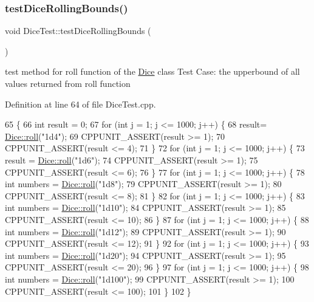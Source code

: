 \subsubsection{\texorpdfstring{test\+Dice\+Rolling\+Bounds()}{testDiceRollingBounds()}}
{\footnotesize\ttfamily void Dice\+Test\+::test\+Dice\+Rolling\+Bounds (\begin{DoxyParamCaption}{ }\end{DoxyParamCaption})\hspace{0.3cm}{\ttfamily [protected]}}

test method for roll function of the \hyperlink{class_dice}{Dice} class Test Case\+: the upperbound of all values returned from roll function 

Definition at line 64 of file Dice\+Test.\+cpp.


\begin{DoxyCode}
65 \{
66     \textcolor{keywordtype}{int} result = 0;
67     \textcolor{keywordflow}{for} (\textcolor{keywordtype}{int} j = 1; j <= 1000; j++) \{
68         result= \hyperlink{class_dice_a4923bdf22040579e6e071e1e987916c2}{Dice::roll}(\textcolor{stringliteral}{"1d4"});
69         CPPUNIT\_ASSERT(result >= 1);
70         CPPUNIT\_ASSERT(result <= 4);
71     \}
72     \textcolor{keywordflow}{for} (\textcolor{keywordtype}{int} j = 1; j <= 1000; j++) \{
73         result = \hyperlink{class_dice_a4923bdf22040579e6e071e1e987916c2}{Dice::roll}(\textcolor{stringliteral}{"1d6"});
74         CPPUNIT\_ASSERT(result >= 1);
75         CPPUNIT\_ASSERT(result <= 6);
76     \}
77     \textcolor{keywordflow}{for} (\textcolor{keywordtype}{int} j = 1; j <= 1000; j++) \{
78         \textcolor{keywordtype}{int} numbers = \hyperlink{class_dice_a4923bdf22040579e6e071e1e987916c2}{Dice::roll}(\textcolor{stringliteral}{"1d8"});
79         CPPUNIT\_ASSERT(result >= 1);
80         CPPUNIT\_ASSERT(result <= 8);
81     \}
82     \textcolor{keywordflow}{for} (\textcolor{keywordtype}{int} j = 1; j <= 1000; j++) \{
83         \textcolor{keywordtype}{int} numbers = \hyperlink{class_dice_a4923bdf22040579e6e071e1e987916c2}{Dice::roll}(\textcolor{stringliteral}{"1d10"});
84         CPPUNIT\_ASSERT(result >= 1);
85         CPPUNIT\_ASSERT(result <= 10);
86     \}
87     \textcolor{keywordflow}{for} (\textcolor{keywordtype}{int} j = 1; j <= 1000; j++) \{
88         \textcolor{keywordtype}{int} numbers = \hyperlink{class_dice_a4923bdf22040579e6e071e1e987916c2}{Dice::roll}(\textcolor{stringliteral}{"1d12"});
89         CPPUNIT\_ASSERT(result >= 1);
90         CPPUNIT\_ASSERT(result <= 12);
91     \}
92     \textcolor{keywordflow}{for} (\textcolor{keywordtype}{int} j = 1; j <= 1000; j++) \{
93         \textcolor{keywordtype}{int} numbers = \hyperlink{class_dice_a4923bdf22040579e6e071e1e987916c2}{Dice::roll}(\textcolor{stringliteral}{"1d20"});
94         CPPUNIT\_ASSERT(result >= 1);
95         CPPUNIT\_ASSERT(result <= 20);
96     \}
97     \textcolor{keywordflow}{for} (\textcolor{keywordtype}{int} j = 1; j <= 1000; j++) \{
98         \textcolor{keywordtype}{int} numbers = \hyperlink{class_dice_a4923bdf22040579e6e071e1e987916c2}{Dice::roll}(\textcolor{stringliteral}{"1d100"});
99         CPPUNIT\_ASSERT(result >= 1);
100         CPPUNIT\_ASSERT(result <= 100);
101     \}
102 \}
\end{DoxyCode}
